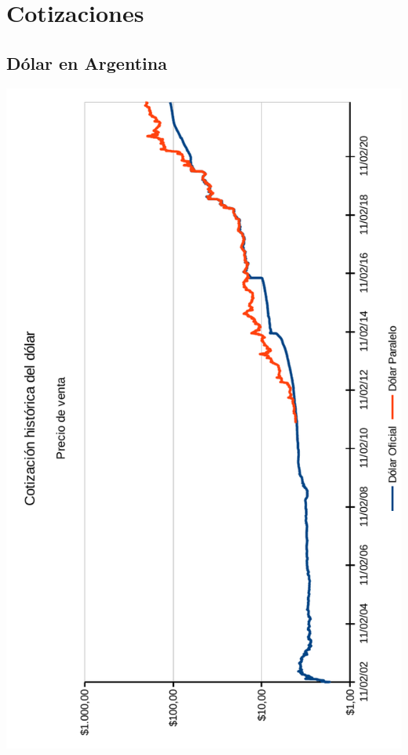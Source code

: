\documentclass[12pt,a4paper,twoside]{book}
\begin{document}
\section{Cotizaciones}
\subsection{Dólar en Argentina}



\newpage

\begin{center}
\includegraphics[scale=0.975]{img/evol-dolar.pdf}
\end{center}
\end{document}
